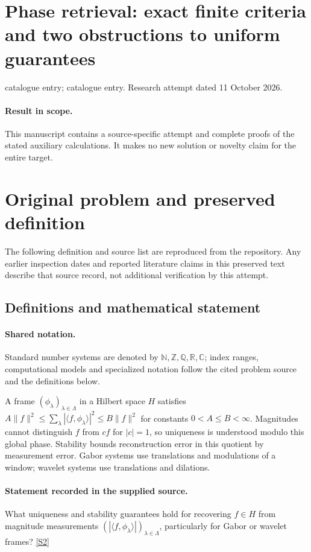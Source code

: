 \documentclass[11pt]{article}
\begin{document}
\section*{Phase retrieval: exact finite criteria and two obstructions to uniform guarantees}
\noindent catalogue entry; catalogue entry. Research attempt dated 11 October 2026.
\paragraph{Result in scope.}This manuscript contains a source-specific attempt and complete proofs of the stated auxiliary calculations. It makes no new solution or novelty claim for the entire target.
\section{Original problem and preserved definition}
The following definition and source list are reproduced from the repository. Any earlier inspection dates and reported literature claims in this preserved text describe that source record, not additional verification by this attempt.
\subsection{Definitions and mathematical statement}

\paragraph{Shared notation.}Standard number systems are denoted by $\mathbb N,\mathbb Z,\mathbb Q,\mathbb R,\mathbb C$; index ranges, computational models and specialized notation follow the cited problem source and the definitions below.


A frame $(\phi_\lambda)_{\lambda\in\Lambda}$ in a Hilbert space $H$ satisfies $A\|f\|^2\leq\sum_\lambda|\langle f,\phi_\lambda\rangle|^2\leq B\|f\|^2$ for constants $0<A\leq B<\infty$. Magnitudes cannot distinguish $f$ from $cf$ for $|c|=1$, so uniqueness is understood modulo this global phase. Stability bounds reconstruction error in this quotient by measurement error. Gabor systems use translations and modulations of a window; wavelet systems use translations and dilations.
\paragraph{Statement recorded in the supplied source.}
What uniqueness and stability guarantees hold for recovering $f\in H$ from magnitude measurements $(|\langle f,\phi_\lambda\rangle|)_{\lambda\in\Lambda}$, particularly for Gabor or wavelet frames? \href{https://doi.org/10.4171/owr/2021/55}{[S2]}
\end{document}
